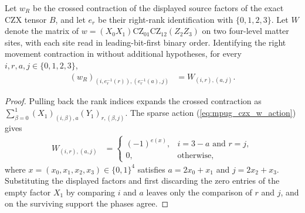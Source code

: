 \begin{lemma}
    \label{thm:mpug_czx_displayed_right_movement_coordinates}
    \leanok
    Let $w_R$ be the crossed contraction of the displayed source factors
    of the exact CZX tensor $B$, and let $e_r$ be their right-rank
    identification with $\{0,1,2,3\}$. Let $W$ denote the matrix of
    $w=(X_0X_1)\mathrm{CZ}_{01}\mathrm{CZ}_{12}(Z_2Z_3)$ on two
    four-level matter sites, with each site read in leading-bit-first
    binary order. Identifying the right movement contraction in
    \cite[lines~811--869, 4559--4659, 4860--4888]{FrancoRubio2025MPUGauging}
    without additional hypotheses, for every $i,r,a,j\in\{0,1,2,3\}$,
    \begin{align}
        (w_R)_{(i,e_r^{-1}(r)),(e_r^{-1}(a),j)}
         & =W_{(i,r),(a,j)}.
    \end{align}
\end{lemma}

\begin{proof}\leanok
    Pulling back the rank indices expands the crossed contraction as
    $\sum_{\beta=0}^1(X_1)_{(i,\beta),a}(Y_1)_{r,(\beta,j)}$.
    The sparse action (\ref{eq:mpug_czx_w_action}) gives
    \begin{align}
        W_{(i,r),(a,j)}
         & =\begin{cases}
                (-1)^{e(x)}, & i=3-a\text{ and }r=j, \\
                0,           & \text{otherwise},
            \end{cases}
    \end{align}
    where $x=(x_0,x_1,x_2,x_3)\in\{0,1\}^4$ satisfies
    $a=2x_0+x_1$ and $j=2x_2+x_3$.
    Substituting the displayed factors and first discarding the zero
    entries of the empty factor $X_1$ by comparing $i$ and $a$ leaves
    only the comparison of $r$ and $j$, and on the surviving support the
    phases agree.
\end{proof}

